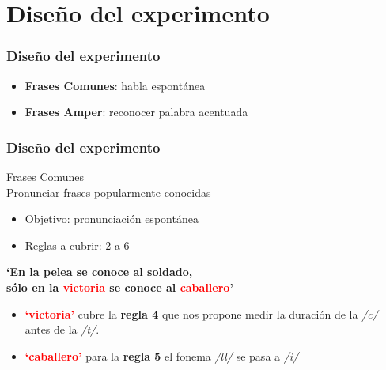 \documentclass[mathserif]{beamer}%
\begin{document}
\section{Diseño del experimento}

\begin{frame}
	\frametitle{Diseño del experimento}
	\begin{itemize}\itemsep=10ex
		\item \textbf{Frases Comunes}: habla espontánea
		\item \textbf{Frases Amper}: reconocer palabra acentuada
	\end{itemize}	
\end{frame} 

\begin{frame}
	\frametitle{Diseño del experimento}
	{\Large Frases Comunes} \\
	Pronunciar frases popularmente conocidas
	
	\begin{itemize}
		\item Objetivo: pronunciación espontánea
		\item Reglas a cubrir: 2 a 6
	\end{itemize}

	\begin{center}
		\textbf{`En la pelea se conoce al soldado,} \\ 
		\textbf{sólo en la \textcolor{red}{victoria} se conoce al \textcolor{red}{caballero}’}
	\end{center}
	
	\begin{itemize}
		\item \textcolor{red}{\textbf{`victoria’}} cubre la \textbf{regla 4} que nos propone medir la duración de la \textit{/c/} antes de la \textit{/t/}. 
		\item \textcolor{red}{\textbf{`caballero’}} para la \textbf{regla 5} el fonema \textit{/ll/} se pasa a \textit{/i/} 
	\end{itemize}	
\end{frame} 
\end{document}
